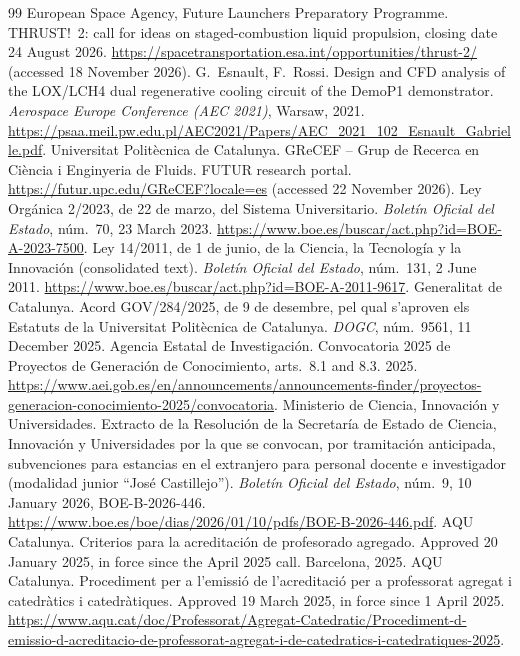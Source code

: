 \documentclass[11pt]{article}
\begin{document}
\begin{thebibliography}{99}
 European Space Agency, Future Launchers Preparatory Programme. THRUST!~2: call for ideas on staged-combustion liquid propulsion, closing date 24 August 2026. \url{https://spacetransportation.esa.int/opportunities/thrust-2/} (accessed 18 November 2026).
 G.\ Esnault, F.\ Rossi. Design and CFD analysis of the LOX/LCH4 dual regenerative cooling circuit of the DemoP1 demonstrator. \emph{Aerospace Europe Conference (AEC 2021)}, Warsaw, 2021. \url{https://psaa.meil.pw.edu.pl/AEC2021/Papers/AEC_2021_102_Esnault_Gabrielle.pdf}.
 Universitat Polit\`ecnica de Catalunya. GReCEF -- Grup de Recerca en Ci\`encia i Enginyeria de Fluids. FUTUR research portal. \url{https://futur.upc.edu/GReCEF?locale=es} (accessed 22 November 2026).
 Ley Org\'anica 2/2023, de 22 de marzo, del Sistema Universitario. \emph{Bolet\'in Oficial del Estado}, n\'um.~70, 23 March 2023. \url{https://www.boe.es/buscar/act.php?id=BOE-A-2023-7500}.
 Ley 14/2011, de 1 de junio, de la Ciencia, la Tecnolog\'ia y la Innovaci\'on (consolidated text). \emph{Bolet\'in Oficial del Estado}, n\'um.~131, 2 June 2011. \url{https://www.boe.es/buscar/act.php?id=BOE-A-2011-9617}.
 Generalitat de Catalunya. Acord GOV/284/2025, de 9 de desembre, pel qual s'aproven els Estatuts de la Universitat Polit\`ecnica de Catalunya. \emph{DOGC}, n\'um.~9561, 11 December 2025.
 Agencia Estatal de Investigaci\'on. Convocatoria 2025 de Proyectos de Generaci\'on de Conocimiento, arts.~8.1 and 8.3. 2025. \url{https://www.aei.gob.es/en/announcements/announcements-finder/proyectos-generacion-conocimiento-2025/convocatoria}.
 Ministerio de Ciencia, Innovaci\'on y Universidades. Extracto de la Resoluci\'on de la Secretar\'ia de Estado de Ciencia, Innovaci\'on y Universidades por la que se convocan, por tramitaci\'on anticipada, subvenciones para estancias en el extranjero para personal docente e investigador (modalidad junior ``Jos\'e Castillejo''). \emph{Bolet\'in Oficial del Estado}, n\'um.~9, 10 January 2026, BOE-B-2026-446. {\def\UrlBreaks{\do\/\do\-}\url{https://www.boe.es/boe/dias/2026/01/10/pdfs/BOE-B-2026-446.pdf}}.
 AQU Catalunya. Criterios para la acreditaci\'on de profesorado agregado. Approved 20 January 2025, in force since the April 2025 call. Barcelona, 2025.
 AQU Catalunya. Procediment per a l'emissi\'o de l'acreditaci\'o per a professorat agregat i catedr\`atics i catedr\`atiques. Approved 19 March 2025, in force since 1 April 2025. {\def\UrlBreaks{\do\/\do\-}\url{https://www.aqu.cat/doc/Professorat/Agregat-Catedratic/Procediment-d-emissio-d-acreditacio-de-professorat-agregat-i-de-catedratics-i-catedratiques-2025}}.

\end{thebibliography}
\end{document}
